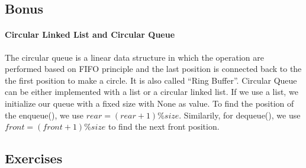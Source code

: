 \documentclass[../main.tex]{subfiles}
\begin{document}

\subsection{Bonus}
\paragraph{Circular Linked List and Circular Queue}  The circular queue is a linear data structure in which the operation are performed based on FIFO principle and the last position is connected back to the the first position to make a circle. It is also called ``Ring Buffer''. Circular Queue can be either implemented with a list or a circular linked list. If we use a list, we initialize our queue with a fixed size with None as value. To find the position of the enqueue(), we use $rear = (rear +1 ) \% size $. Similarily, for dequeue(), we use $front = (front+1) \% size$ to find the next front position. 

\subsection{Exercises}
\end{document}
